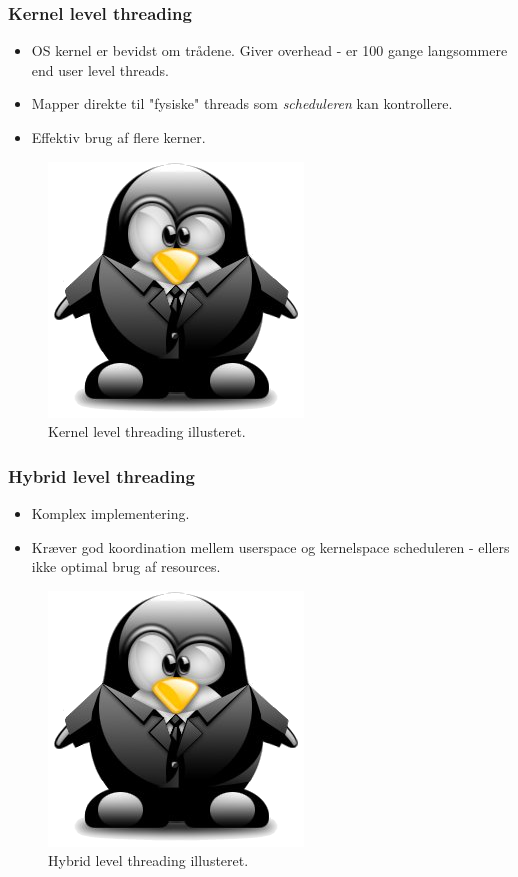\subsubsection{Kernel level threading}
\begin{itemize}
	\item OS kernel er bevidst om trådene. Giver overhead - er 100 gange langsommere end user level threads.
	\item Mapper direkte til "fysiske" threads som \textit{scheduleren} kan kontrollere.
	\item Effektiv brug af flere kerner.
\end{itemize}

\begin{figure}[H]
	\centering
	\includegraphics{figs/kernelthreads}
	\caption{Kernel level threading illusteret.}
	\label{fig:kernelthreads}
\end{figure}

\subsubsection{Hybrid level threading}
\begin{itemize}
	\item Komplex implementering.
	\item Kræver god koordination mellem userspace og kernelspace scheduleren - ellers ikke optimal brug af resources.
\end{itemize}

\begin{figure}[H]
	\centering
	\includegraphics{figs/hybridthreads}
	\caption{Hybrid level threading illusteret.}
	\label{fig:hybridthreads}
\end{figure}


